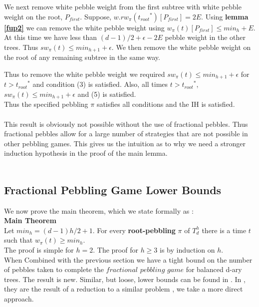 \documentclass[12pt]{article}
\newcommand{\troots}{{t_{root}}^*}
\begin{document}
We next remove white pebble weight from the first subtree with white pebble weight on the root, $P_{first}$. Suppose, $w.rw_\pi(\troots)[P_{first}] = 2E$. Using {\bf lemma \ref{fup2}} we can remove the white pebble weight using $w_\pi(t)[P_{first}] \leq min_h + E$. At this time we have less than $(d-1)/2+\epsilon - 2E$ pebble weight in the other trees. Thus $sw_\pi(t) \leq min_{h+1}+\epsilon$. We then remove the white pebble weight on the root of any remaining subtree in the same way.

Thus to remove the white pebble weight we required $sw_\pi(t) \leq min_{h+1}+\epsilon$ for $t>\troots$ and condition (3) is satisfied. Also, all times $t > \troots$, $sw_\pi(t) \leq min_{h+1}+\epsilon$ and (5) is satisfied.\\

Thus the specified pebbling $\pi$ satisfies all conditions and the IH is satisfied.\\\\

This result is obviously not possible without the use of fractional pebbles. Thus fractional pebbles allow for a large number of strategies that are not possible in other pebbling games. This gives us the intuition as to why we need a stronger induction hypothesis in the proof of the main lemma.\\\\
 

\subsection{Fractional Pebbling Game Lower Bounds} 

\noindent
We now prove the main theorem, which we state formally as :\\

\noindent
{\bf Main Theorem} \\Let $min_h = (d-1)h/2+1$.
For every {\bf root-pebbling} $\pi$ of $T^h_d$ there is a time $t$ such
that $w_\pi(t) \ge min_h$.\\

\noindent
The proof is simple for $h=2$. The proof for $h\geq3$ is by induction on $h$.\\

When Combined with the previous section we have a tight bound on the number of pebbles taken to complete the $fractional $ $pebbling$ $game$ for balanced d-ary trees. The result is new. Similar, but loose, lower bounds can be found in \cite{c:pebjournal}. In \cite{c:pebjournal}, they are the result of a reduction to a similar problem \cite{k:bwpyr}, we take a more direct approach.
\end{document}

